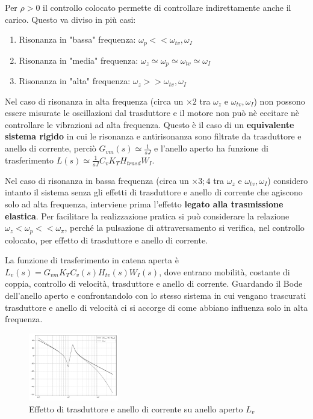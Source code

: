 Per \(\rho > 0\) il controllo colocato permette di controllare indirettamente anche il carico.
Questo va diviso in più casi:
\begin{enumerate}
    \item Risonanza in "bassa" frequenza: \(\omega_p << \omega_{tv}, \omega_I\)
    \item Risonanza in "media" frequenza: \(\omega_z \simeq \omega_p \simeq \omega_{tv} \simeq \omega_I\)
    \item Risonanza in "alta" frequenza: \(\omega_z >> \omega_{tv}, \omega_I\)
\end{enumerate} 

Nel caso di risonanza in alta frequenza (circa un \(\times 2\) tra \(\omega_z\) e \(\omega_{tv},\omega_I\)) non possono essere misurate le oscillazioni dal trasduttore e il motore non può nè eccitare nè controllare le vibrazioni ad alta frequenza. Questo è il caso di un \textbf{equivalente sistema rigido} in cui le risonanza e antirisonanza sono filtrate da trasduttore e anello di corrente, perciò \(G_{vm}(s) \simeq \frac{1}{sJ}\) e l'anello aperto ha funzione di trasferimento \(L(s) \simeq \frac{1}{sJ} C_v K_T H_{trasd} W_I\).

Nel caso di risonanza in bassa frequenza (circa un \(\times 3;4\) tra \(\omega_z\) e \(\omega_{tv}, \omega_I\)) considero intanto il sistema senza gli effetti di trasduttore e anello di corrente che agiscono solo ad alta frequenza, interviene prima l'effetto \textbf{legato alla trasmissione elastica}.
Per facilitare la realizzazione pratica si può considerare la relazione \(\omega_z < \omega_p << \omega_\pi\), perché la pulsazione di attraversamento si verifica, nel controllo colocato, per effetto di trasduttore e anello di corrente.

La funzione di trasferimento in catena aperta è \(L_v(s) = G_{vm}K_T C_v(s) H_{tv}(s) W_I(s)\), dove entrano mobilità, costante di coppia, controllo di velocità, trasduttore e anello di corrente.
Guardando il Bode dell'anello aperto e confrontandolo con lo stesso sistema in cui vengano trascurati trasduttore e anello di velocità ci si accorge di come abbiano influenza solo in alta frequenza.

\begin{figure}[h]
    \centering
    \includegraphics[width=0.35\textwidth]{Immagini/risonanza_bassa_f_Gvm_vs_Lv.png}
    \caption{Effetto di trasduttore e anello di corrente su anello aperto \(L_v\)}
\end{figure}

